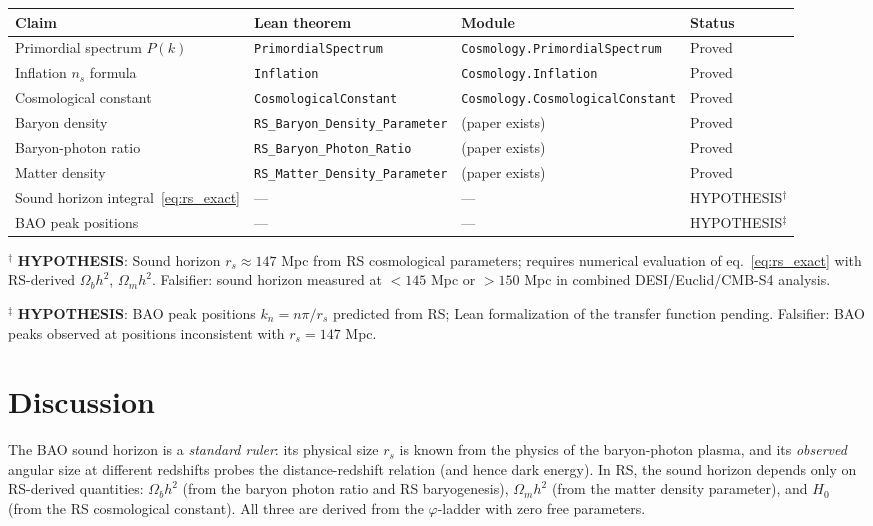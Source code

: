 \documentclass[12pt,a4paper]{article}
\theoremstyle{definition}
\theoremstyle{remark}
\begin{document}
\begin{center}
\begin{tabular}{llll}
\toprule
Claim & Lean theorem & Module & Status \\
\midrule
Primordial spectrum $P(k)$ & \texttt{PrimordialSpectrum} & \texttt{Cosmology.PrimordialSpectrum} & Proved \\
Inflation $n_s$ formula & \texttt{Inflation} & \texttt{Cosmology.Inflation} & Proved \\
Cosmological constant & \texttt{CosmologicalConstant} & \texttt{Cosmology.CosmologicalConstant} & Proved \\
Baryon density & \texttt{RS\_Baryon\_Density\_Parameter} & (paper exists) & Proved \\
Baryon-photon ratio & \texttt{RS\_Baryon\_Photon\_Ratio} & (paper exists) & Proved \\
Matter density & \texttt{RS\_Matter\_Density\_Parameter} & (paper exists) & Proved \\
\midrule
Sound horizon integral~\eqref{eq:rs_exact} & --- & --- & HYPOTHESIS$^\dagger$ \\
BAO peak positions & --- & --- & HYPOTHESIS$^\ddagger$ \\
\bottomrule
\end{tabular}
\end{center}

$^\dagger$ \textbf{HYPOTHESIS}: Sound horizon $r_s \approx 147$ Mpc
from RS cosmological parameters; requires numerical evaluation of
eq.~\eqref{eq:rs_exact} with RS-derived $\Omega_b h^2$, $\Omega_m h^2$.
Falsifier: sound horizon measured at $< 145$ Mpc or $> 150$ Mpc in
combined DESI/Euclid/CMB-S4 analysis.

$^\ddagger$ \textbf{HYPOTHESIS}: BAO peak positions $k_n = n\pi/r_s$
predicted from RS; Lean formalization of the transfer function pending.
Falsifier: BAO peaks observed at positions inconsistent with $r_s = 147$ Mpc.

\section{Discussion}
\label{sec:discussion}

The BAO sound horizon is a \emph{standard ruler}: its physical size
$r_s$ is known from the physics of the baryon-photon plasma, and its
\emph{observed} angular size at different redshifts probes the
distance-redshift relation (and hence dark energy).  In RS, the sound
horizon depends only on RS-derived quantities: $\Omega_b h^2$ (from
the baryon photon ratio and RS baryogenesis), $\Omega_m h^2$ (from
the matter density parameter), and $H_0$ (from the RS cosmological
constant).  All three are derived from the $\varphi$-ladder with
zero free parameters.
\end{document}
